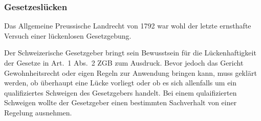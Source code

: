 \subsubsection{Gesetzeslücken}
Das Allgemeine Preussische Landrecht von 1792 war wohl der letzte
ernsthafte Versuch einer lückenlosen Gesetzgebung\autocite[Seite
332]{wieacker}.

Der Schweizerische Gesetzgeber bringt sein Bewusstsein für die
Lücken\-haftigkeit der Gesetze in Art.\ 1 Abs.\ 2 ZGB zum Ausdruck. Bevor
jedoch das Gericht Gewohnheitsrecht oder eigen Regeln zur Anwendung
bringen kann, muss geklärt werden, ob überhaupt eine Lücke vorliegt oder
ob es sich allenfalls um ein qualifiziertes Schweigen des Gesetzgebers
handelt. Bei einem qulaifizierten Schweigen wollte der Gesetzgeber einen
bestimmten Sachverhalt von einer Regelung ausnehmen\autocite[\S\ 4 N.\
88]{riemer_einleitungsartikel}.
